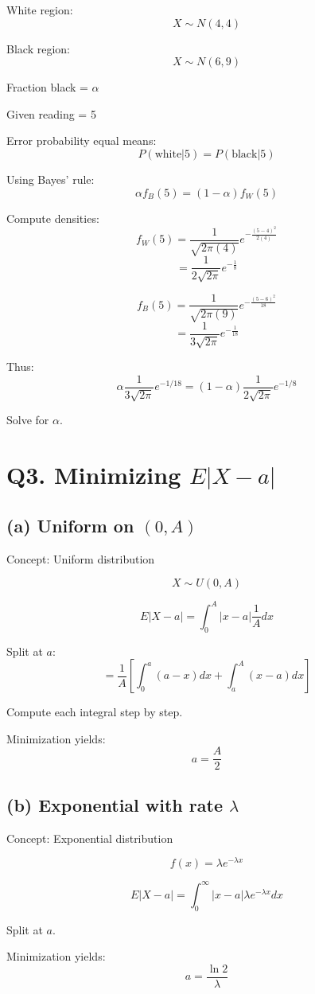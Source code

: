 \documentclass[11pt]{article}
\begin{document}
White region:
\[
X \sim N(4,4)
\]

Black region:
\[
X \sim N(6,9)
\]

Fraction black = $\alpha$

Given reading = 5

Error probability equal means:
\[
P(\text{white}|5) = P(\text{black}|5)
\]

Using Bayes’ rule:
\[
\alpha f_B(5) = (1-\alpha) f_W(5)
\]

Compute densities:
\[
f_W(5) = \frac{1}{\sqrt{2\pi(4)}} e^{-\frac{(5-4)^2}{2(4)}}
\]
\[
= \frac{1}{2\sqrt{2\pi}} e^{-\frac{1}{8}}
\]

\[
f_B(5) = \frac{1}{\sqrt{2\pi(9)}} e^{-\frac{(5-6)^2}{18}}
\]
\[
= \frac{1}{3\sqrt{2\pi}} e^{-\frac{1}{18}}
\]

Thus:
\[
\alpha \frac{1}{3\sqrt{2\pi}} e^{-1/18}
=
(1-\alpha) \frac{1}{2\sqrt{2\pi}} e^{-1/8}
\]

Solve for $\alpha$.

\section*{Q3. Minimizing $E|X-a|$}

\subsection*{(a) Uniform on $(0,A)$}

Concept: Uniform distribution

\[
X \sim U(0,A)
\]

\[
E|X-a| = \int_0^A |x-a|\frac{1}{A} dx
\]

Split at $a$:
\[
= \frac{1}{A}\left[
\int_0^a (a-x)dx + \int_a^A (x-a)dx
\right]
\]

Compute each integral step by step.

Minimization yields:
\[
a = \frac{A}{2}
\]

\subsection*{(b) Exponential with rate $\lambda$}

Concept: Exponential distribution

\[
f(x)=\lambda e^{-\lambda x}
\]

\[
E|X-a|=\int_0^\infty |x-a|\lambda e^{-\lambda x}dx
\]

Split at $a$.

Minimization yields:
\[
a = \frac{\ln 2}{\lambda}
\]
\end{document}
